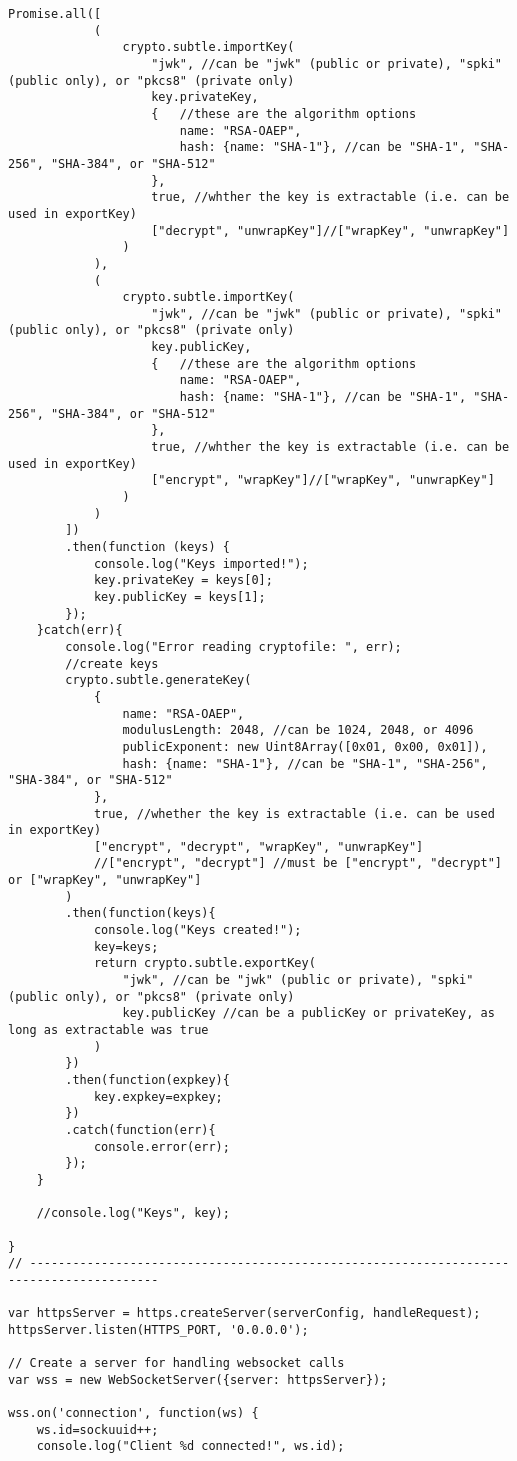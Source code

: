 \begin{lstlisting}[caption=ACS Server, style=htmlcssjs]
		Promise.all([
			(
				crypto.subtle.importKey(
					"jwk", //can be "jwk" (public or private), "spki" (public only), or "pkcs8" (private only)
					key.privateKey,
					{   //these are the algorithm options
						name: "RSA-OAEP",
						hash: {name: "SHA-1"}, //can be "SHA-1", "SHA-256", "SHA-384", or "SHA-512"
					},
					true, //whther the key is extractable (i.e. can be used in exportKey)
					["decrypt", "unwrapKey"]//["wrapKey", "unwrapKey"]
				)
			),
			(
				crypto.subtle.importKey(
					"jwk", //can be "jwk" (public or private), "spki" (public only), or "pkcs8" (private only)
					key.publicKey,
					{   //these are the algorithm options
						name: "RSA-OAEP",
						hash: {name: "SHA-1"}, //can be "SHA-1", "SHA-256", "SHA-384", or "SHA-512"
					},
					true, //whther the key is extractable (i.e. can be used in exportKey)
					["encrypt", "wrapKey"]//["wrapKey", "unwrapKey"]
				)
			)
		])
		.then(function (keys) {
			console.log("Keys imported!");
			key.privateKey = keys[0];
			key.publicKey = keys[1];
		});
	}catch(err){
		console.log("Error reading cryptofile: ", err);
		//create keys
		crypto.subtle.generateKey(
			{
				name: "RSA-OAEP",
				modulusLength: 2048, //can be 1024, 2048, or 4096
				publicExponent: new Uint8Array([0x01, 0x00, 0x01]),
				hash: {name: "SHA-1"}, //can be "SHA-1", "SHA-256", "SHA-384", or "SHA-512"
			},
			true, //whether the key is extractable (i.e. can be used in exportKey)
			["encrypt", "decrypt", "wrapKey", "unwrapKey"]
			//["encrypt", "decrypt"] //must be ["encrypt", "decrypt"] or ["wrapKey", "unwrapKey"]
		)
		.then(function(keys){
			console.log("Keys created!");
			key=keys;
			return crypto.subtle.exportKey(
				"jwk", //can be "jwk" (public or private), "spki" (public only), or "pkcs8" (private only)
				key.publicKey //can be a publicKey or privateKey, as long as extractable was true
			)
		})
		.then(function(expkey){
			key.expkey=expkey;
		})
		.catch(function(err){
			console.error(err);
		});
	}
	
	//console.log("Keys", key);
	
}
// ----------------------------------------------------------------------------------------

var httpsServer = https.createServer(serverConfig, handleRequest);
httpsServer.listen(HTTPS_PORT, '0.0.0.0');

// Create a server for handling websocket calls
var wss = new WebSocketServer({server: httpsServer});

wss.on('connection', function(ws) {
   	ws.id=sockuuid++;
   	console.log("Client %d connected!", ws.id);


\end{lstlisting}
